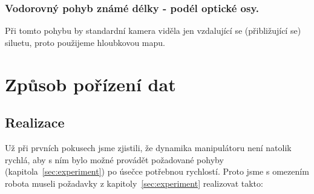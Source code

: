 \documentclass[10pt,a4paper,titlepage,oneside]{report}
\begin{document}
\subsection{Vodorovný pohyb známé délky - podél optické osy.}
Při tomto pohybu by standardní kamera viděla jen vzdalující se (přibližující se) siluetu, proto použijeme hloubkovou mapu.






\chapter{Způsob pořízení dat}

\section{Realizace}
Už při prvních pokusech jsme zjistili, že dynamika manipulátoru není natolik rychlá, aby s ním bylo možné provádět požadované pohyby (kapitola~\ref{sec:experiment}) po úsečce potřebnou rychlostí. Proto jsme s omezením robota museli požadavky z kapitoly~\ref{sec:experiment} realizovat takto:
\end{document}
